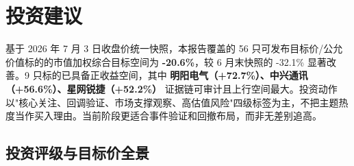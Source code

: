 \chapter{投资建议}

\begin{houseviewbox}[投资建议总纲]
基于 2026 年 7 月 3 日收盘价统一快照，本报告覆盖的 56 只可发布目标价/公允价值标的的市值加权综合目标空间为 \textbf{-20.6\%}，较 6 月末快照的 -32.1\% 显著改善。9 只标的已具备正收益空间，其中 \textbf{明阳电气（+72.7\%）、中兴通讯（+56.6\%）、星网锐捷（+52.2\%）} 证据链可审计且上行空间最大。投资动作以"核心关注、回调验证、市场支撑观察、高估值风险"四级标签为主，不把主题热度当作买入理由。当前阶段更适合事件验证和回撤布局，而非无差别追高。
\end{houseviewbox}

\section{投资评级与目标价全景}

